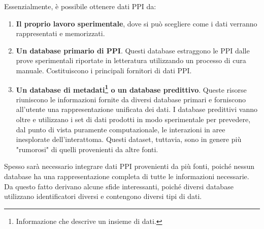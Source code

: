\documentclass[11pt]{article}
\begin{document}
Essenzialmente, è possibile ottenere dati PPI da:
\begin{enumerate}
\setlength{\itemsep}{1pt}
  \setlength{\parskip}{0pt}
  \setlength{\parsep}{0pt}
\item \textbf{Il proprio lavoro sperimentale}, dove si può scegliere come i dati verranno rappresentati e memorizzati.
\item \textbf{Un database primario di PPI}. Questi database estraggono le PPI dalle prove sperimentali riportate in letteratura utilizzando un processo di cura manuale. Costituiscono i principali fornitori di dati PPI.
\item \textbf{Un database di metadati\footnote{Informazione che descrive un insieme di dati.} o un database predittivo}. Queste risorse riuniscono le informazioni fornite da diversi database primari e forniscono all'utente una rappresentazione unificata dei dati. 
I database predittivi vanno oltre e utilizzano i set di dati prodotti in modo sperimentale per prevedere, dal punto di vista puramente computazionale, le interazioni in aree inesplorate dell'interattoma. Questi dataset, tuttavia, sono in genere più "rumorosi" di quelli provenienti da altre fonti.
\end{enumerate}

Spesso sarà necessario integrare dati PPI provenienti da più fonti, poiché nessun database ha una rappresentazione completa di tutte le informazioni necessarie. Da questo fatto derivano alcune sfide interessanti, poiché diversi database utilizzano  identificatori diversi e contengono diversi tipi di dati.\\
\end{document}
